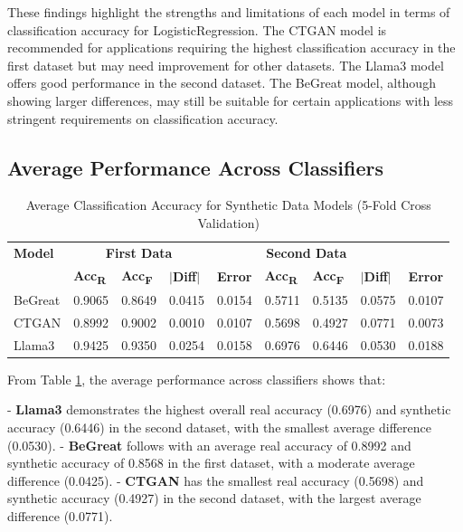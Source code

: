 \vspace{0.5cm}

These findings highlight the strengths and limitations of each model in terms of classification accuracy for LogisticRegression. The CTGAN model is recommended for applications requiring the highest classification accuracy in the first dataset but may need improvement for other datasets. The Llama3 model offers good performance in the second dataset. The BeGreat model, although showing larger differences, may still be suitable for certain applications with less stringent requirements on classification accuracy.
\subsection{Average Performance Across Classifiers}

\begin{table}[H]
\centering
\caption{Average Classification Accuracy for Synthetic Data Models (5-Fold Cross Validation)}
\label{tab:average_classification_accuracy_combined}
\begin{tabularx}{\textwidth}{l*{8}{X}}
    \toprule
    \textbf{Model} & \multicolumn{3}{c}{\textbf{First Data}} & \multicolumn{4}{c}{\textbf{Second Data}} \\
    \cmidrule(lr){2-4} \cmidrule(lr){5-8}
    & \textbf{Acc\textsubscript{R}} & \textbf{Acc\textsubscript{F}} & \textbf{$|$Diff$|$} & \textbf{Error} & \textbf{Acc\textsubscript{R}} & \textbf{Acc\textsubscript{F}} & \textbf{$|$Diff$|$} & \textbf{Error} \\
    \midrule
    BeGreat & 0.9065 & 0.8649 & 0.0415 & 0.0154 & 0.5711 & 0.5135 & 0.0575 & 0.0107 \\
    CTGAN & 0.8992 & 0.9002 & 0.0010 & 0.0107 & 0.5698 & 0.4927 & 0.0771 & 0.0073 \\
    Llama3 & 0.9425 & 0.9350 & 0.0254 & 0.0158 & 0.6976 & 0.6446 & 0.0530 & 0.0188 \\
    \bottomrule
\end{tabularx}
\end{table}


From Table \ref{tab:average_classification_accuracy_combined}, the average performance across classifiers shows that:

- \textbf{Llama3} demonstrates the highest overall real accuracy (0.6976) and synthetic accuracy (0.6446) in the second dataset, with the smallest average difference (0.0530).
- \textbf{BeGreat} follows with an average real accuracy of 0.8992 and synthetic accuracy of 0.8568 in the first dataset, with a moderate average difference (0.0425).
- \textbf{CTGAN} has the smallest real accuracy (0.5698) and synthetic accuracy (0.4927) in the second dataset, with the largest average difference (0.0771).

